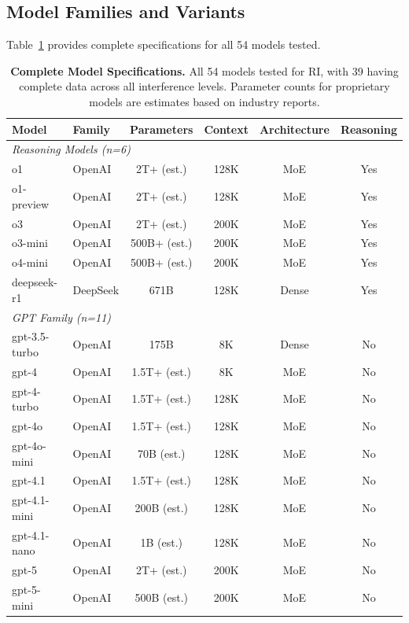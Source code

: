 \documentclass{article}
\begin{document}
\subsection{Model Families and Variants}

Table~\ref{tab:model_specs} provides complete specifications for all 54 models tested.

\begin{table}[t]
\centering
\small
\caption{\textbf{Complete Model Specifications.} All 54 models tested for RI, with 39 having complete data across all interference levels. Parameter counts for proprietary models are estimates based on industry reports.}
\label{tab:model_specs}
\begin{tabular}{llcccc}
\toprule
\textbf{Model} & \textbf{Family} & \textbf{Parameters} & \textbf{Context} & \textbf{Architecture} & \textbf{Reasoning} \\
\midrule
\multicolumn{6}{l}{\textit{Reasoning Models (n=6)}} \\
o1 & OpenAI & 2T+ (est.) & 128K & MoE & Yes \\
o1-preview & OpenAI & 2T+ (est.) & 128K & MoE & Yes \\
o3 & OpenAI & 2T+ (est.) & 200K & MoE & Yes \\
o3-mini & OpenAI & 500B+ (est.) & 200K & MoE & Yes \\
o4-mini & OpenAI & 500B+ (est.) & 200K & MoE & Yes \\
deepseek-r1 & DeepSeek & 671B & 128K & Dense & Yes \\
\midrule
\multicolumn{6}{l}{\textit{GPT Family (n=11)}} \\
gpt-3.5-turbo & OpenAI & 175B & 8K & Dense & No \\
gpt-4 & OpenAI & 1.5T+ (est.) & 8K & MoE & No \\
gpt-4-turbo & OpenAI & 1.5T+ (est.) & 128K & MoE & No \\
gpt-4o & OpenAI & 1.5T+ (est.) & 128K & MoE & No \\
gpt-4o-mini & OpenAI & 70B (est.) & 128K & MoE & No \\
gpt-4.1 & OpenAI & 1.5T+ (est.) & 128K & MoE & No \\
gpt-4.1-mini & OpenAI & 200B (est.) & 128K & MoE & No \\
gpt-4.1-nano & OpenAI & 1B (est.) & 128K & MoE & No \\
gpt-5 & OpenAI & 2T+ (est.) & 200K & MoE & No \\
gpt-5-mini & OpenAI & 500B (est.) & 200K & MoE & No \\

\end{tabular}
\end{table}
\end{document}
